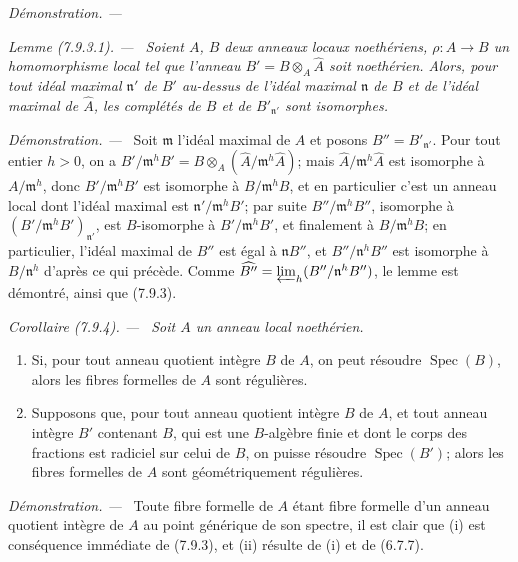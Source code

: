 \documentclass[10pt,oneside]{book}
\newenvironment{corollary}[1][]{%
  \par\medskip\noindent\itshape Corollaire (#1). ---\ }{\par}
\newenvironment{lemma}[1][]{%
  \par\medskip\noindent\itshape Lemme (#1). ---\ }{\par}
\newenvironment{proof}{%
  \par\medskip\noindent\textit{Démonstration. ---\ }}{\par}
\begin{document}
\begin{proof}
\begin{lemma}[7.9.3.1]
\label{IV.2.s7.9.3.1-fr}
Soient $A$, $B$ deux anneaux locaux noethériens,
$\rho:A\to B$ un homomorphisme local tel que l'anneau
$B'=B\otimes_A\widehat A$ soit noethérien. Alors, pour tout idéal maximal
$\mathfrak n'$ de $B'$ au-dessus de l'idéal maximal $\mathfrak n$ de $B$ et
de l'idéal maximal de $\widehat A$, les complétés de $B$ et de
$B'_{\mathfrak n'}$ sont isomorphes.
\end{lemma}

\begin{proof}
Soit $\mathfrak m$ l'idéal maximal de $A$ et posons
$B''=B'_{\mathfrak n'}$. Pour tout entier $h>0$, on a
$B'/\mathfrak m^hB'=B\otimes_A(\widehat A/\mathfrak m^h\widehat A)$; mais
$\widehat A/\mathfrak m^h\widehat A$ est isomorphe à
$A/\mathfrak m^h$, donc $B'/\mathfrak m^hB'$ est isomorphe à
$B/\mathfrak m^hB$, et en particulier c'est un anneau local dont l'idéal
maximal est $\mathfrak n'/\mathfrak m^hB'$; par suite
$B''/\mathfrak m^hB''$, isomorphe à
$(B'/\mathfrak m^hB')_{\mathfrak n'}$, est $B$-isomorphe à
$B'/\mathfrak m^hB'$, et finalement à $B/\mathfrak m^hB$; en particulier,
l'idéal maximal de $B''$ est égal à $\mathfrak nB''$, et
$B''/\mathfrak n^hB''$ est isomorphe à $B/\mathfrak n^h$ d'après ce qui
précède. Comme
$\widehat{B''}=\varprojlim_h(B''/\mathfrak n^hB'')$, le lemme est démontré,
ainsi que (7.9.3).
\end{proof}
\end{proof}

\begin{corollary}[7.9.4]
\label{IV.2.s7.9.4-fr}
Soit $A$ un anneau local noethérien.
\begin{enumerate}
\item[\emph{(i)}] Si, pour tout anneau quotient intègre $B$ de $A$, on peut
résoudre $\operatorname{Spec}(B)$, alors les fibres formelles de $A$ sont
régulières.
\item[\emph{(ii)}] Supposons que, pour tout anneau quotient intègre $B$ de
$A$, et tout anneau intègre $B'$ contenant $B$, qui est une $B$-algèbre finie
et dont le corps des fractions est radiciel sur celui de $B$, on puisse
résoudre $\operatorname{Spec}(B')$; alors les fibres formelles de $A$ sont
géométriquement régulières.
\end{enumerate}
\end{corollary}

\begin{proof}
Toute fibre formelle de $A$ étant fibre formelle d'un anneau quotient intègre
de $A$ au point générique de son spectre, il est clair que (i) est conséquence
immédiate de (7.9.3), et (ii) résulte de (i) et de (6.7.7).
\end{proof}
\end{document}
